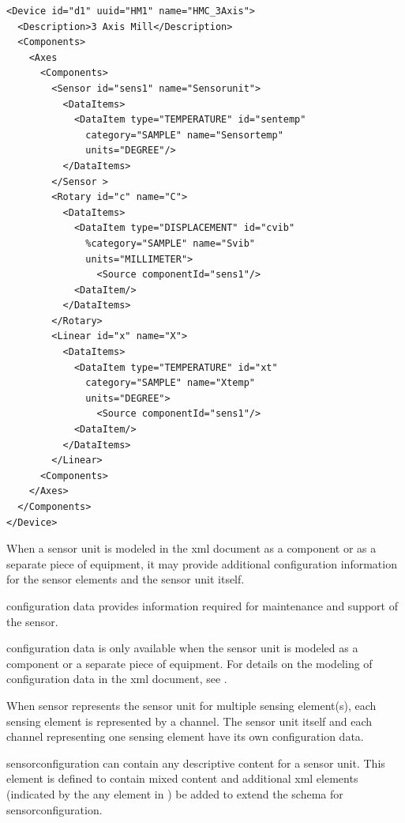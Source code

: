 \begin{lstlisting}[firstnumber=1,escapechar=|,%
    caption={Example of Sensor Unit with Sensing Element}, label={lst:example-of-sensor-with-sensing-elements}]
<Device id="d1" uuid="HM1" name="HMC_3Axis">
  <Description>3 Axis Mill</Description>
  <Components>
    <Axes
      <Components>
        <Sensor id="sens1" name="Sensorunit">
          <DataItems>
            <DataItem type="TEMPERATURE" id="sentemp"
              category="SAMPLE" name="Sensortemp" 
              units="DEGREE"/> 
          </DataItems>
        </Sensor >
        <Rotary id="c" name="C">
          <DataItems>
            <DataItem type="DISPLACEMENT" id="cvib"
              %category="SAMPLE" name="Svib" 
              units="MILLIMETER">
                <Source componentId="sens1"/>
            <DataItem/>
          </DataItems>
        </Rotary>
        <Linear id="x" name="X">
          <DataItems>
            <DataItem type="TEMPERATURE" id="xt" 
              category="SAMPLE" name="Xtemp" 
              units="DEGREE">
                <Source componentId="sens1"/>
            <DataItem/>
          </DataItems>
        </Linear>
      <Components>
    </Axes>
  </Components>
</Device>
\end{lstlisting}

When a \gls{sensor} unit is modeled in the \gls{xml} document as a \gls{component} or as a separate piece of equipment, it may provide additional configuration information for the \glspl{sensor element} and the \gls{sensor unit} itself.  

\gls{configuration} data provides information required for maintenance and support of the sensor.

\gls{configuration} data is only available when the \gls{sensor} unit is modeled as a \gls{component} or a separate piece of equipment. For details on the modeling of configuration data in the \gls{xml} document, see .

When \gls{sensor} represents the \gls{sensor unit} for multiple \gls{sensing element}(s), each sensing element is represented by a \gls{channel}.   The \gls{sensor unit} itself and each \gls{channel} representing one \gls{sensing element} \may have its own configuration data.

\gls{sensorconfiguration} can contain any descriptive content for a \gls{sensor unit}.  This element is defined to contain mixed content and additional \gls{xml} elements (indicated by the \gls{any} element in ) \may be added to extend the schema for \gls{sensorconfiguration}.



